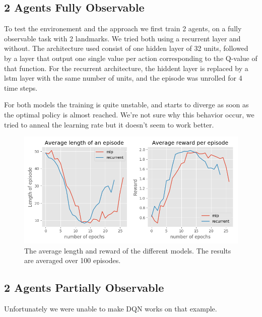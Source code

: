\documentclass{article} %
\begin{document}
\subsection{2 Agents Fully Observable}
To test the environement and the approach we first train 2 agents, on a fully observable task with 2 landmarks.
We tried both using a recurrent layer and without. The architecture used  consist of one hidden layer of 32 units, followed by a layer that output one single value per action corresponding to the Q-value of that function. For the recurrent architecture, the hiddent layer is replaced by a lstm layer with the same number of units, and the episode was unrolled for 4 time steps.

For both models the training is quite unstable, and starts to diverge as soon as the optimal policy is almost reached. We're not sure why this behavior occur, we tried to anneal the learning rate but it doesn't seem to work better.

\begin{figure}[h]
\centering
\includegraphics[width=\textwidth]{multiagent_mdp_results.png}
\caption{The average length and reward of the different models. The results are averaged over 100 episodes.}
\end{figure}

\subsection{2 Agents Partially Observable}
Unfortunately we were unable to make DQN works on that example.

  

\end{document}
